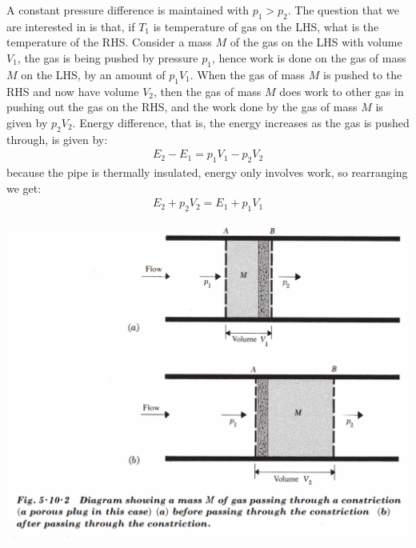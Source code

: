 \documentclass[11pt,oneside]{book}
\theoremstyle{break}
\theoremstyle{break}
\begin{document}
A constant pressure difference is maintained with $p_1>p_2$. The question that we are interested in is that, if $T_1$ is temperature of gas on the LHS, what is the temperature of the RHS. Consider a mass $M$ of the gas on the LHS with volume $V_1$, the gas is being pushed by pressure $p_1$, hence work is done on the gas of mass $M$ on the LHS, by an amount of $p_1 V_1$. When the gas of mass $M$ is pushed to the RHS and now have volume $V_2$, then the gas of mass $M$ does work to other gas in pushing out the gas on the RHS, and the work done by the gas of mass $M$ is given by $p_2V_2$. Energy difference, that is, the energy increases as the gas is pushed through, is given by:
\begin{align*}
E_2 - E_1 = p_1 V_1 - p_2 V_2
\end{align*}
because the pipe is thermally insulated, energy only involves work, so rearranging we get:
\begin{align*}
E_2 + p_2 V_2 = E_1 + p_1 V_1
\end{align*}
\begin{center}
\includegraphics[scale=0.39]{plugAndM.png}
\end{center}
\end{document}
